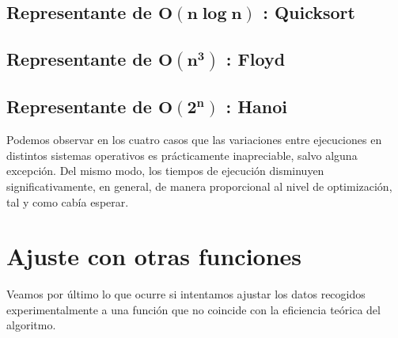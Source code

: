\documentclass[11pt]{article}
\begin{document}
\subsection*{Representante de $\boldsymbol{O(n\log n)}$ : Quicksort}
	\begin{center}
		
	\end{center}

	\begin{center}
		
	\end{center}

\subsection*{Representante de $\boldsymbol{O(n^3)}$ : Floyd}
	\begin{center}
		
	\end{center}

	\begin{center}
		
	\end{center}

\subsection*{Representante de $\boldsymbol{O(2^n)}$ : Hanoi}
	\begin{center}
		
	\end{center}

	\begin{center}
		
	\end{center}
	
	
	Podemos observar en los cuatro casos que las variaciones entre ejecuciones en distintos sistemas operativos es prácticamente inapreciable, salvo alguna excepción. Del mismo modo, los tiempos de ejecución disminuyen significativamente, en general, de manera proporcional al nivel de optimización, tal y como cabía esperar.
	
	\newpage
	
\section*{Ajuste con otras funciones}

	Veamos por último lo que ocurre si intentamos ajustar los datos recogidos experimentalmente a una función que no coincide con la eficiencia teórica del algoritmo.
\end{document}

